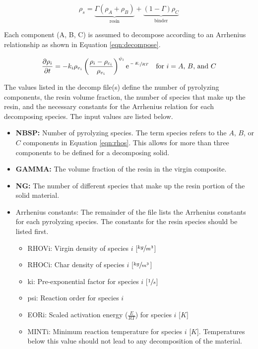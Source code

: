 \documentclass[]{article}
\newcommand{\deriv}[2]{\frac{\partial #1}{\partial #2}}
\begin{document}
\begin{equation} \label{eqn:rhos}
	\rho_s = \underbrace{\Gamma (\rho_A + \rho_B)}_\text{resin} + \underbrace{(1-\Gamma) \rho_C}_\text{binder}
\end{equation}

Each component (A, B, C) is assumed to decompose according to an Arrhenius relationship as shown in Equation \ref{eqn:decompose}.

\begin{equation} \label{eqn:decompose}
	\deriv{\rho_i}{t} = -k_i \rho_{v_{i}} \left(\frac{\rho_i - \rho_{c_{i}}}{\rho_{v_{i}}}\right)^{\psi_i} \mathrm{e}^{\sfrac{-E_i}{RT}} \quad \text{for \(i=A\), \(B\), and \(C\)}
\end{equation}

The values listed in the decomp file(s) define the number of pyrolyzing components, the resin volume fraction, the number of species that make up the resin, and the necessary constants for the Arrhenius relation for each decomposing species. The input values are listed below.

\begin{itemize}
\item \textbf{NBSP:} Number of pyrolyzing species. The term species refers to the \(A\), \(B\), or \(C\) components in Equation \ref{eqn:rhos}. This allows for more than three components to be defined for a decomposing solid.
\item \textbf{GAMMA:} The volume fraction of the resin in the virgin composite.
\item \textbf{NG:} The number of different species that make up the resin portion of the solid material.
\item Arrhenius constants: The remainder of the file lists the Arrhenius constants for each pyrolyzing species. The constants for the resin species should be listed first.
	\begin{itemize}
		\item RHOVi: Virgin density of species \(i\) [\(\sfrac{kg}{m^3}\)]
		\item RHOCi: Char density of species \(i\) [\(\sfrac{kg}{m^3}\)]
		\item ki: Pre-exponential factor for species \(i\) [\(\sfrac{1}{s}\)]
		\item psi: Reaction order for species \(i\) 
		\item EORi: Scaled activation energy (\(\frac{E}{RT}\)) for species \(i\) [\(K\)]
		\item MINTi: Minimum reaction temperature for species \(i\) [\(K\)]. Temperatures below this value should not lead to any decomposition of the material.
	\end{itemize}
\end{itemize}	 
      
\end{document}
